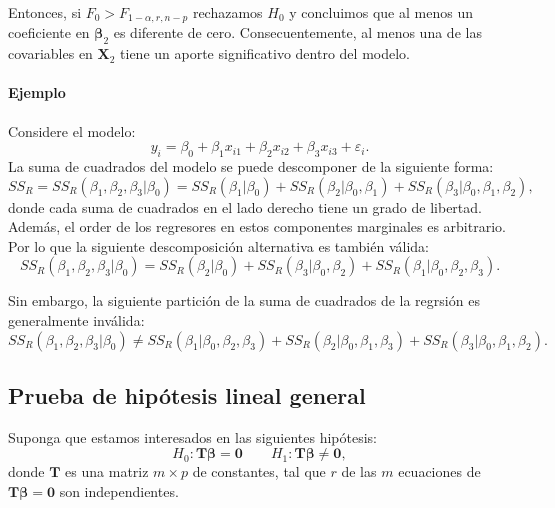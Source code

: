 \documentclass[
]{article}
\begin{document}
Entonces, si \(F_{0} > F_{1-\alpha,r,n-p}\) rechazamos \(H_{0}\) y concluimos que al menos un coeficiente en \(\boldsymbol \beta_{2}\) es diferente de cero. Consecuentemente, al menos una de las covariables en \(\boldsymbol X_{2}\) tiene un aporte significativo dentro del modelo.

\hypertarget{ejemplo}{%
\paragraph*{Ejemplo}\label{ejemplo}}

Considere el modelo:
\[
y_{i} = \beta_{0} + \beta_{1}x_{i1} + \beta_{2}x_{i2} + \beta_{3}x_{i3} + \varepsilon_{i}.
\]
La suma de cuadrados del modelo se puede descomponer de la siguiente forma:
\[
SS_{R}=SS_{R}(\beta_{1},\beta_{2},\beta_{3}| \beta_{0}) = SS_{R}(\beta_{1}|\beta_{0}) + SS_{R}(\beta_{2}|\beta_{0},\beta_{1}) + SS_{R}(\beta_{3}|\beta_{0},\beta_{1},\beta_{2}),
\]
donde cada suma de cuadrados en el lado derecho tiene un grado de libertad. Además, el order de los regresores en estos componentes marginales es arbitrario. Por lo que la siguiente descomposición alternativa es también válida:
\[
SS_{R}(\beta_{1},\beta_{2},\beta_{3}| \beta_{0})=SS_{R}(\beta_{2}|\beta_{0}) + SS_{R}(\beta_{3}|\beta_{0},\beta_{2}) + SS_{R}(\beta_{1}|\beta_{0},\beta_{2},\beta_{3}).
\]

Sin embargo, la siguiente partición de la suma de cuadrados de la regrsión es generalmente inválida:
\[
SS_{R}(\beta_{1},\beta_{2},\beta_{3}| \beta_{0})\neq SS_{R}(\beta_{1}|\beta_{0},\beta_{2},\beta_{3}) + SS_{R}(\beta_{2}|\beta_{0},\beta_{1},\beta_{3}) + SS_{R}(\beta_{3}|\beta_{0},\beta_{1},\beta_{2}).
\]

\hypertarget{prueba-de-hipuxf3tesis-lineal-general}{%
\subsection{Prueba de hipótesis lineal general}\label{prueba-de-hipuxf3tesis-lineal-general}}

Suponga que estamos interesados en las siguientes hipótesis:
\begin{equation}
H_{0}: \boldsymbol T\boldsymbol \beta=\boldsymbol 0\qquad H_{1}: \boldsymbol T\boldsymbol \beta\neq \boldsymbol 0,
\label{eq:hipGeneral1}
\end{equation}
donde \(\boldsymbol T\) es una matriz \(m \times p\) de constantes, tal que \(r\) de las \(m\) ecuaciones de \(\boldsymbol T\boldsymbol \beta=\boldsymbol 0\) son independientes.
\end{document}
